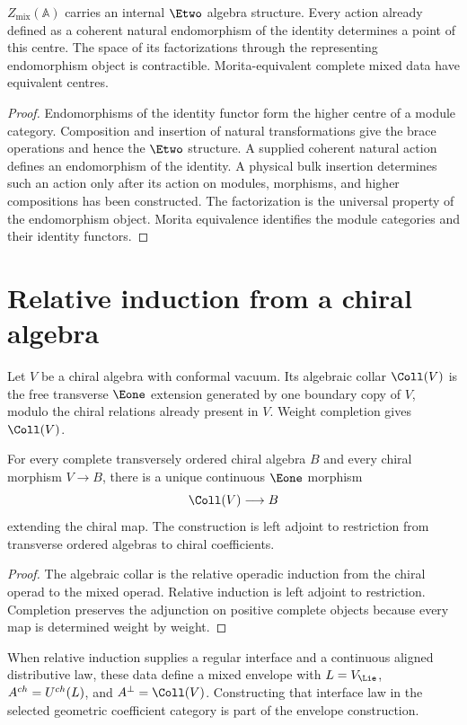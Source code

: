 \begin{theorem}
$Z_{\mathrm{mix}}(\mathbb A)$ carries an internal $\Etwo$ algebra structure.  Every action already defined as a coherent natural endomorphism of the identity determines a point of this centre. The space of its factorizations through the representing endomorphism object is contractible.  Morita-equivalent complete mixed data have equivalent centres.
\end{theorem}
\begin{proof}
Endomorphisms of the identity functor form the higher centre of a module category.  Composition and insertion of natural transformations give the brace operations and hence the $\Etwo$ structure.  A supplied coherent natural action defines an endomorphism of the identity. A physical bulk insertion determines such an action only after its action on modules, morphisms, and higher compositions has been constructed.  The factorization is the universal property of the endomorphism object.  Morita equivalence identifies the module categories and their identity functors.
\end{proof}

\chapter{Relative induction from a chiral algebra}
Let $V$ be a chiral algebra with conformal vacuum.  Its algebraic collar $\Coll(V)$ is the free transverse $\Eone$ extension generated by one boundary copy of $V$, modulo the chiral relations already present in $V$.  Weight completion gives $\widehat\Coll(V)$.

\begin{theorem}
For every complete transversely ordered chiral algebra $B$ and every chiral morphism $V\to B$, there is a unique continuous $\Eone$ morphism
\[
 \widehat\Coll(V)\longrightarrow B
\]
extending the chiral map.  The construction is left adjoint to restriction from transverse ordered algebras to chiral coefficients.
\end{theorem}
\begin{proof}
The algebraic collar is the relative operadic induction from the chiral operad to the mixed operad.  Relative induction is left adjoint to restriction.  Completion preserves the adjunction on positive complete objects because every map is determined weight by weight.
\end{proof}

When relative induction supplies a regular interface and a continuous aligned distributive law, these data define a mixed envelope with $L=V_{\Lie}$, $A^{ch}=U^{ch}(L)$, and $A^\perp=\widehat\Coll(V)$. Constructing that interface law in the selected geometric coefficient category is part of the envelope construction.

